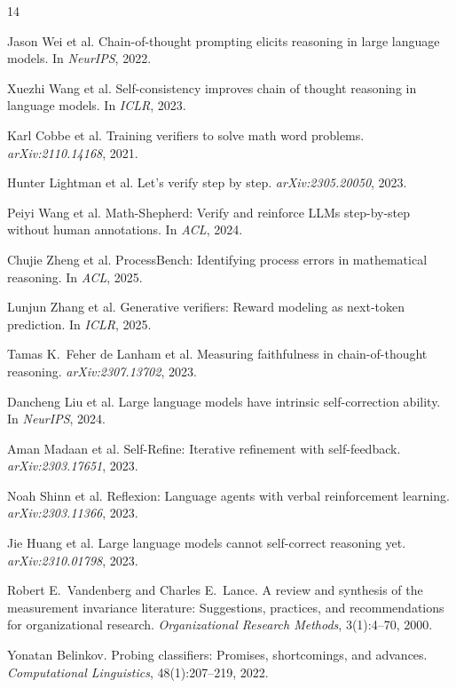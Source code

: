 \documentclass[10pt,twocolumn]{article}
\begin{document}

\begin{thebibliography}{14}

Jason Wei et al.
\newblock Chain-of-thought prompting elicits reasoning in large language models.
\newblock In \emph{NeurIPS}, 2022.

Xuezhi Wang et al.
\newblock Self-consistency improves chain of thought reasoning in language models.
\newblock In \emph{ICLR}, 2023.

Karl Cobbe et al.
\newblock Training verifiers to solve math word problems.
\newblock \emph{arXiv:2110.14168}, 2021.

Hunter Lightman et al.
\newblock Let's verify step by step.
\newblock \emph{arXiv:2305.20050}, 2023.

Peiyi Wang et al.
\newblock Math-Shepherd: Verify and reinforce {LLM}s step-by-step without human annotations.
\newblock In \emph{ACL}, 2024.

Chujie Zheng et al.
\newblock ProcessBench: Identifying process errors in mathematical reasoning.
\newblock In \emph{ACL}, 2025.

Lunjun Zhang et al.
\newblock Generative verifiers: Reward modeling as next-token prediction.
\newblock In \emph{ICLR}, 2025.

Tamas K.\ Feher de Lanham et al.
\newblock Measuring faithfulness in chain-of-thought reasoning.
\newblock \emph{arXiv:2307.13702}, 2023.

Dancheng Liu et al.
\newblock Large language models have intrinsic self-correction ability.
\newblock In \emph{NeurIPS}, 2024.

Aman Madaan et al.
\newblock Self-Refine: Iterative refinement with self-feedback.
\newblock \emph{arXiv:2303.17651}, 2023.

Noah Shinn et al.
\newblock Reflexion: Language agents with verbal reinforcement learning.
\newblock \emph{arXiv:2303.11366}, 2023.

Jie Huang et al.
\newblock Large language models cannot self-correct reasoning yet.
\newblock \emph{arXiv:2310.01798}, 2023.

Robert E.\ Vandenberg and Charles E.\ Lance.
\newblock A review and synthesis of the measurement invariance literature: Suggestions, practices, and recommendations for organizational research.
\newblock \emph{Organizational Research Methods}, 3(1):4--70, 2000.

Yonatan Belinkov.
\newblock Probing classifiers: Promises, shortcomings, and advances.
\newblock \emph{Computational Linguistics}, 48(1):207--219, 2022.

\end{thebibliography}
\end{document}
